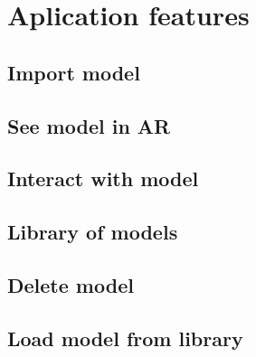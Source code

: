 \chapter{Aplication features}\label{cap:aplicationfeatures}

\section{Import model}
\section{See model in AR}
\section{Interact with model}
\section{Library of models}
\section{Delete model}
\section{Load model from library}
